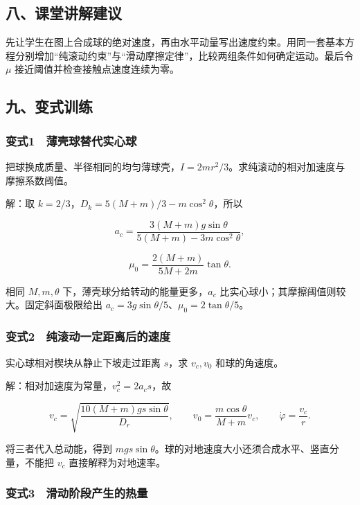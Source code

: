 \documentclass[12pt,a4paper,fontset=fandol]{ctexart}
\begin{document}
\subsection{八、课堂讲解建议}\label{ux516bux8bfeux5802ux8bb2ux89e3ux5efaux8bae-2}

先让学生在图上合成球的绝对速度，再由水平动量写出速度约束。用同一套基本方程分别增加``纯滚动约束''与``滑动摩擦定律''，比较两组条件如何确定运动。最后令
\(\mu\) 接近阈值并检查接触点速度连续为零。

\subsection{九、变式训练}\label{ux4e5dux53d8ux5f0fux8badux7ec3-2}

\subsubsection{变式1　薄壳球替代实心球}\label{ux53d8ux5f0f1-ux8584ux58f3ux7403ux66ffux4ee3ux5b9eux5fc3ux7403}

把球换成质量、半径相同的均匀薄球壳，\(I=2mr^2/3\)。求纯滚动的相对加速度与摩擦系数阈值。

解：取 \(k=2/3\)，\(D_k=5(M+m)/3-m\cos^2\theta\)，所以

\[a_c=\frac{3(M+m)g\sin\theta}{5(M+m)-3m\cos^2\theta},\]

\[\mu_0=\frac{2(M+m)}{5M+2m}\tan\theta.\]

相同 \(M,m,\theta\) 下，薄壳球分给转动的能量更多，\(a_c\)
比实心球小；其摩擦阈值则较大。固定斜面极限给出
\(a_c=3g\sin\theta/5\)、\(\mu_0=2\tan\theta/5\)。

\subsubsection{变式2　纯滚动一定距离后的速度}\label{ux53d8ux5f0f2-ux7eafux6edaux52a8ux4e00ux5b9aux8dddux79bbux540eux7684ux901fux5ea6}

实心球相对楔块从静止下坡走过距离 \(s\)，求 \(v_c,v_0\) 和球的角速度。

解：相对加速度为常量，\(v_c^2=2a_cs\)，故

\[v_c=\sqrt{\frac{10(M+m)gs\sin\theta}{D_r}},\qquad
v_0=\frac{m\cos\theta}{M+m}v_c,\qquad
\dot\varphi=\frac{v_c}{r}.\]

将三者代入总动能，得到
\(mgs\sin\theta\)。球的对地速度大小还须合成水平、竖直分量，不能把
\(v_c\) 直接解释为对地速率。

\subsubsection{变式3　滑动阶段产生的热量}\label{ux53d8ux5f0f3-ux6ed1ux52a8ux9636ux6bb5ux4ea7ux751fux7684ux70edux91cf}
\end{document}
